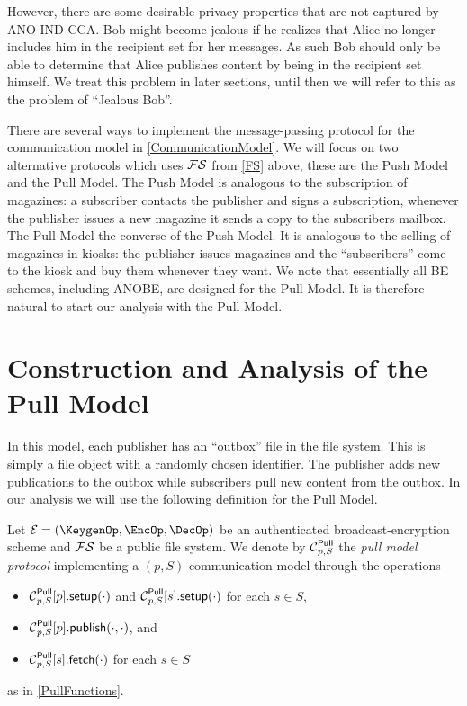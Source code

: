 
However, there are some desirable privacy properties that are not captured by 
ANO-IND-CCA\@.
Bob might become jealous if he realizes that Alice no longer includes him in 
the recipient set for her messages.
As such Bob should only be able to determine that Alice publishes content by 
being in the recipient set himself.
We treat this problem in later sections, until then we will refer to this as 
the problem of \enquote{Jealous Bob}.

There are several ways to implement the message-passing protocol for the 
communication model in \cref{CommunicationModel}.
We will focus on two alternative protocols which uses \(\FS\) from \cref{FS} 
above, these are the Push Model and the Pull Model.
The Push Model is analogous to the subscription of magazines:
a subscriber contacts the publisher and signs a subscription, whenever the 
publisher issues a new magazine it sends a copy to the subscribers mailbox.
The Pull Model the converse of the Push Model.
It is analogous to the selling of magazines in kiosks:
the publisher issues magazines and the \enquote{subscribers} come to the kiosk 
and buy them whenever they want.
We note that essentially all \ac{BE} schemes, including \ac{ANOBE}, are 
designed for the Pull Model.
It is therefore natural to start our analysis with the Pull Model.


\section{Construction and Analysis of the Pull Model}
\label{PullAnalysis}

In this model, each publisher has an \enquote{outbox} file in the file system.
This is simply a file object with a randomly chosen identifier.
The publisher adds new publications to the outbox while subscribers pull new 
content from the outbox.
In our analysis we will use the following definition for the Pull Model.

\begin{definition}\label{PullModel}
  Let \(\mathcal{E} = (\KeygenOp, \EncOp, \DecOp)\) be an authenticated 
  broadcast-encryption scheme and \(\FS\) be a public file system.
  We denote by \(\Pull[p, S]\) the \emph{pull model protocol} implementing 
  a \((p, S)\)-communication model through the operations
  \begin{itemize}
    \item \(\psetup[p, S]{p}[\cdot]\) and \(\psetup[p, S]{s}[\cdot]\) for each
      \(s\in S\),
    \item \(\ppub[p, S]{p}[\cdot][\cdot]\), and
    \item \(\pget[p, S]{s}[\cdot]\) for each \(s\in S\)
  \end{itemize}
  as in \cref{PullFunctions}.
\end{definition}

